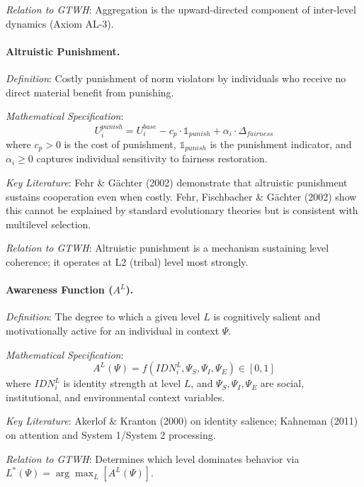 \documentclass[12pt,a4paper]{article}
\begin{document}
\textit{Relation to GTWH}: Aggregation is the upward-directed component of 
inter-level dynamics (Axiom AL-3).

\medskip

\paragraph{Altruistic Punishment.}
\textit{Definition}: Costly punishment of norm violators by individuals who receive 
no direct material benefit from punishing.

\textit{Mathematical Specification}:
\begin{equation}
U_i^{punish} = U_i^{base} - c_p \cdot \mathbb{1}_{punish} + \alpha_i \cdot \Delta_{fairness}
\end{equation}
where $c_p > 0$ is the cost of punishment, $\mathbb{1}_{punish}$ is the punishment 
indicator, and $\alpha_i \geq 0$ captures individual sensitivity to fairness restoration.

\textit{Key Literature}: Fehr \& Gächter (2002) demonstrate that altruistic punishment 
sustains cooperation even when costly. Fehr, Fischbacher \& Gächter (2002) show this 
cannot be explained by standard evolutionary theories but is consistent with 
multilevel selection.

\textit{Relation to GTWH}: Altruistic punishment is a mechanism sustaining level 
coherence; it operates at L2 (tribal) level most strongly.

\medskip

\paragraph{Awareness Function ($A^L$).}
\textit{Definition}: The degree to which a given level $L$ is cognitively salient 
and motivationally active for an individual in context $\Psi$.

\textit{Mathematical Specification}:
\begin{equation}
A^L(\Psi) = f\left( IDN^L_i, \Psi_S, \Psi_I, \Psi_E \right) \in [0, 1]
\end{equation}
where $IDN^L_i$ is identity strength at level $L$, and $\Psi_S, \Psi_I, \Psi_E$ 
are social, institutional, and environmental context variables.

\textit{Key Literature}: Akerlof \& Kranton (2000) on identity salience; 
Kahneman (2011) on attention and System 1/System 2 processing.

\textit{Relation to GTWH}: Determines which level dominates behavior via 
$L^*(\Psi) = \arg\max_L [A^L(\Psi)]$.
\end{document}
